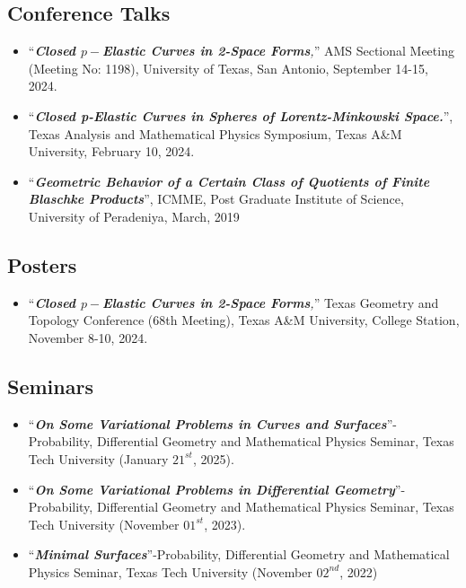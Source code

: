\documentclass[12pt]{book}
\begin{document}
\subsection*{Conference Talks}
\begin{itemize}
	\item ``\textit{\textbf{Closed $p-$Elastic Curves in 2-Space Forms},}'' AMS Sectional Meeting (Meeting No: 1198), University of Texas, San Antonio, September 14-15, 2024.
	\item ``\textit{\textbf{Closed p-Elastic Curves in Spheres of Lorentz-Minkowski Space.}}'', Texas Analysis and Mathematical Physics Symposium, Texas A\&M University, February 10, 2024.
	\item ``\textit{\textbf{Geometric Behavior of a Certain Class of Quotients of Finite Blaschke Products}}'', ICMME, Post Graduate Institute of Science, University of Peradeniya, March, 2019
\end{itemize}

\subsection*{Posters}
\begin{itemize}
	\item ``\textit{\textbf{Closed $p-$Elastic Curves in 2-Space Forms},}'' Texas Geometry and Topology Conference (68th Meeting),  Texas A\&M University, College  Station, November 8-10, 2024.
\end{itemize}

\subsection*{Seminars}
\begin{itemize}
	\item ``\textit{\textbf{On Some Variational Problems in Curves and Surfaces}}''- Probability, Differential Geometry and Mathematical Physics Seminar, Texas Tech University (January $21^{st}$, 2025).
	\item ``\textit{\textbf{On Some Variational Problems in Differential Geometry}}''- Probability, Differential Geometry and Mathematical Physics Seminar, Texas Tech University (November $01^{st}$, 2023).

\item ``\textit{\textbf{Minimal Surfaces}}''-Probability, Differential Geometry and Mathematical Physics Seminar, Texas Tech University (November $02^{nd}$, 2022)

\end{itemize}
\end{document}
